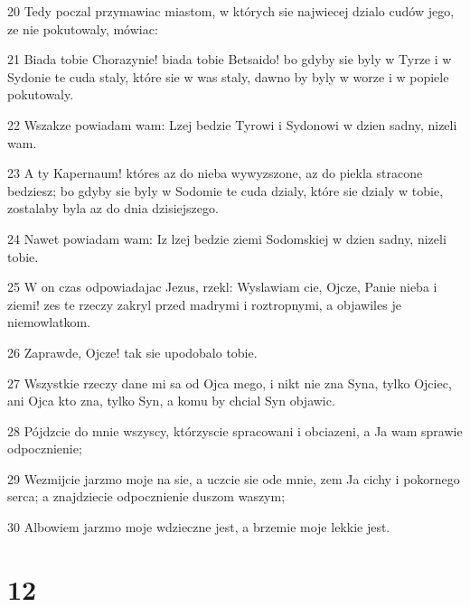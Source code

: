 \par 20 Tedy poczal przymawiac miastom, w których sie najwiecej dzialo cudów jego, ze nie pokutowaly, mówiac:
\par 21 Biada tobie Chorazynie! biada tobie Betsaido! bo gdyby sie byly w Tyrze i w Sydonie te cuda staly, które sie w was staly, dawno by byly w worze i w popiele pokutowaly.
\par 22 Wszakze powiadam wam: Lzej bedzie Tyrowi i Sydonowi w dzien sadny, nizeli wam.
\par 23 A ty Kapernaum! któres az do nieba wywyzszone, az do piekla stracone bedziesz; bo gdyby sie byly w Sodomie te cuda dzialy, które sie dzialy w tobie, zostalaby byla az do dnia dzisiejszego.
\par 24 Nawet powiadam wam: Iz lzej bedzie ziemi Sodomskiej w dzien sadny, nizeli tobie.
\par 25 W on czas odpowiadajac Jezus, rzekl: Wyslawiam cie, Ojcze, Panie nieba i ziemi! zes te rzeczy zakryl przed madrymi i roztropnymi, a objawiles je niemowlatkom.
\par 26 Zaprawde, Ojcze! tak sie upodobalo tobie.
\par 27 Wszystkie rzeczy dane mi sa od Ojca mego, i nikt nie zna Syna, tylko Ojciec, ani Ojca kto zna, tylko Syn, a komu by chcial Syn objawic.
\par 28 Pójdzcie do mnie wszyscy, którzyscie spracowani i obciazeni, a Ja wam sprawie odpocznienie;
\par 29 Wezmijcie jarzmo moje na sie, a uczcie sie ode mnie, zem Ja cichy i pokornego serca; a znajdziecie odpocznienie duszom waszym;
\par 30 Albowiem jarzmo moje wdzieczne jest, a brzemie moje lekkie jest.

\chapter{12}

